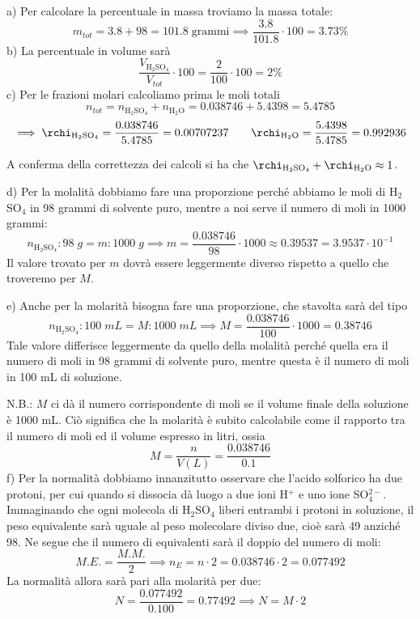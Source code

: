 \vspace{0.2cm}a) Per calcolare la percentuale in massa troviamo la massa totale:
$$m_{tot}=3.8 + 98=101.8 \; \text{grammi}
\implies \frac{3.8}{101.8} \cdot 100 = 3.73 \%$$
b) La percentuale in volume sarà
$$\frac{V_{\text{H}_2\text{SO}_4}}{V_{tot}} \cdot 100= \frac{2}{100} \cdot 100 = 2 \%$$
c) Per le frazioni molari calcoliamo prima le moli totali
$$n_{tot}=n_{\text{H}_2\text{SO}_4} + n_{\text{H}_2\text{O}}=0.038746 + 5.4398= 5.4785$$
$$\implies \rchi_{\text{H}_2\text{SO}_4}=\frac{0.038746}{5.4785}=0.00707237
\qquad
\rchi_{\text{H}_2\text{O}}=\frac{5.4398}{5.4785}=0.992936$$

\vspace{0.2cm}A conferma della correttezza dei calcoli si ha che $\rchi_{\text{H}_2\text{SO}_4} + \rchi_{\text{H}_2\text{O}} \approx 1$.

\vspace{0.2cm}d) Per la molalità dobbiamo fare una proporzione perché abbiamo le moli di H$_2$SO$_4$ in 98 grammi di solvente puro, mentre a noi serve il numero di moli in 1000 grammi:
$$n_{\text{H}_2\text{SO}_4}:98 \; g = m :1000 \; g
\implies m = \frac{0.038746}{98} \cdot 1000
\approx 0.39537= 3.9537 \cdot 10^{-1}$$
Il valore trovato per $m$ dovrà essere leggermente diverso rispetto a quello che troveremo per $M$.

\vspace{0.2cm}e) Anche per la molarità bisogna fare una proporzione, che stavolta sarà del tipo
$$n_{\text{H}_2\text{SO}_4}: 100 \; mL = M :1000 \; mL
\implies 
M=\frac{0.038746}{100} \cdot 1000 = 0.38746$$
Tale valore differisce leggermente da quello della molalità perché quella era il numero di moli in 98 grammi di solvente puro, mentre questa è il numero di moli in 100 mL di soluzione.

\vspace{0.2cm}N.B.: $M$ ci dà il numero corrispondente di moli se il volume finale della soluzione è 1000 mL. Ciò significa che la molarità è subito calcolabile come il rapporto tra il numero di moli ed il volume espresso in litri, ossia
$$M=\frac{n}{V(L)}=\frac{0.038746}{0.1}$$
f) Per la normalità dobbiamo innanzitutto osservare che l'acido solforico ha due protoni, per cui quando si dissocia dà luogo a due ioni H$^+$ e uno ione SO$_4^{2-}$. Immaginando che ogni molecola di H$_2$SO$_4$ liberi entrambi i protoni in soluzione, il peso equivalente sarà uguale al peso molecolare diviso due, cioè sarà 49 anziché 98. Ne segue che il numero di equivalenti sarà il doppio del numero di moli:
$$M.E.=\frac{M.M.}{2} \implies n_E=n \cdot 2 = 0.038746 \cdot 2 = 0.077492$$
La normalità allora sarà pari alla molarità per due:
$$N=\frac{0.077492}{0.100}=0.77492 \implies N=M \cdot 2$$
\newpage